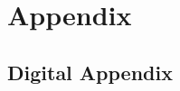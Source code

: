 \documentclass[twoside,a4paper,11pt,openright]{report}
\begin{document}





%
%

\appendix
\part*{Appendix}
\markboth{}{}
\captionsetup{list=no}

\cleardoublepage
%

\chapter{Digital Appendix} \label{chap:digital_appendix}




\cleardoublepage
\end{document}
